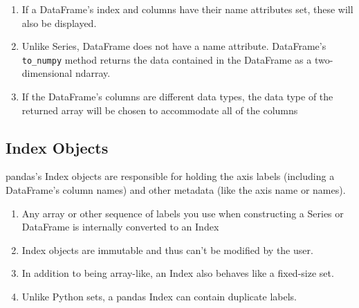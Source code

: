 \begin{enumerate}
    \item If a DataFrame's index and columns have their name attributes set, these will also be displayed.
    \item Unlike Series, DataFrame does not have a name attribute. DataFrame's \verb|to_numpy| method returns the data contained in the DataFrame as a two-dimensional ndarray.
    \item If the DataFrame's columns are different data types, the data type of the returned
          array will be chosen to accommodate all of the columns
\end{enumerate}

\subsection{Index Objects}
pandas's Index objects are responsible for holding the axis labels (including a DataFrame's column names) and other metadata (like the axis name or names).

\begin{enumerate}
    \item Any array or other sequence of labels you use when constructing a Series or DataFrame is internally converted to an Index
    \item Index objects are immutable and thus can't be modified by the user.
    \item In addition to being array-like, an Index also behaves like a fixed-size set.
    \item Unlike Python sets, a pandas Index can contain duplicate labels.
\end{enumerate}

